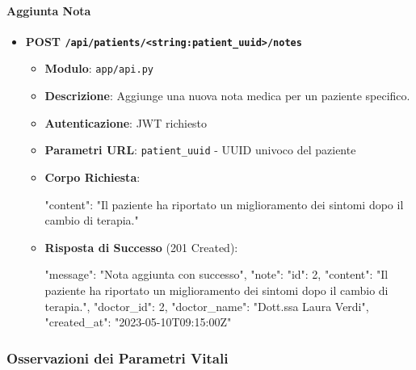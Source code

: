 \documentclass[12pt,a4paper,oneside]{report}
\begin{document}
\paragraph{Aggiunta Nota}
\begin{itemize}
    \item \textbf{POST \texttt{/api/patients/<string:patient\_uuid>/notes}}
          \begin{itemize}
              \item \textbf{Modulo}: \texttt{app/api.py}
              \item \textbf{Descrizione}: Aggiunge una nuova nota medica per un paziente specifico.
              \item \textbf{Autenticazione}: JWT richiesto
              \item \textbf{Parametri URL}: \texttt{patient\_uuid} - UUID univoco del paziente
              \item \textbf{Corpo Richiesta}:
                    \begin{spverbatim}
                        {
                            "content": "Il paziente ha riportato un miglioramento dei sintomi dopo il cambio di terapia."
                        }
                    \end{spverbatim}
              \item \textbf{Risposta di Successo} (201 Created):
                    \begin{spverbatim}
                        {
                        "message": "Nota aggiunta con successo",
                        "note": {
                        "id": 2,
                        "content": "Il paziente ha riportato un miglioramento dei sintomi dopo il cambio di terapia.",
                        "doctor_id": 2,
                        "doctor_name": "Dott.ssa Laura Verdi",
                        "created_at": "2023-05-10T09:15:00Z"
                        }
                        }
                    \end{spverbatim}
          \end{itemize}
\end{itemize}

\subsubsection{Osservazioni dei Parametri Vitali}
\end{document}
